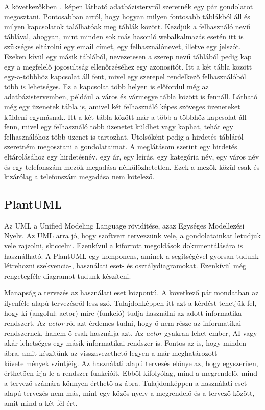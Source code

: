 \documentclass[]{thesis-ekf}
\theoremstyle{definition}
\theoremstyle{remark}
\begin{document}
	A következőkben .~képen látható adatbázistervről szeretnék egy pár gondolatot megosztani. Pontosabban arról, hogy hogyan milyen fontosabb táblákból áll és milyen kapcsolatok találhatóak meg táblák között. Kezdjük a felhasználó nevű táblával, ahogyan, mint minden sok más hasonló webalkalmazás esetén itt is szükséges eltárolni egy email címet, egy felhasználónevet, illetve egy jelszót. Ezeken kívül egy másik táblából, nevezetesen a szerep nevű táblából pedig kap egy a megfelelő jogosultság ellenőrzéséhez egy azonosítót. Itt a két tábla között egy-a-többhöz kapcsolat áll fent, mivel egy szerepel rendelkező felhasználóból több is lehetséges. Ez a kapcsolat több helyen is előfordul még az adatbázistervemben, például a város és vármegye tábla között is fennáll. Látható még egy üzenetek tábla is, amivel két felhasználó képes szöveges üzeneteket küldeni egymásnak. Itt a két tábla között már a több-a-többhöz kapcsolat áll fenn, mivel egy felhasználó több üzenetet küldhet vagy kaphat, tehát egy felhasználóhoz több üzenet is tartozhat. Utolsóként pedig a hirdetés tábláról szeretném megosztani a gondolataimat. A meglátásom szerint egy hirdetés eltárolásához egy hirdetésnév, egy ár, egy leírás, egy kategória név, egy város név és egy telefonszám mezők megadása nélkülözhetetlen. Ezek a mezők közül csak és kizárólag a telefonszám megadása nem kötelező. 
	
	\subsection{PlantUML}\label{sc-plantuml}
	Az UML a Unified Modeling Language rövidítése, azaz Egységes Modellezési Nyelv. Az UML arra jó, hogy szoftvert tervezzünk vele, a gondolatainkat letudjuk vele rajzolni, skiccelni. Ezenkívül a kiforrott megoldások dokumentálására is használható. A PlantUML egy komponens, aminek a segítségével gyorsan tudunk létrehozni szekvencia-, használati eset- és osztálydiagramokat. Ezenkívül még rengetegféle diagramot tudunk készíteni. \cite{PlantUML}
	
	Manapság a tervezés az használati eset központú. A következő pár mondatban az ilyenféle alapú tervezésről lesz szó. Tulajdonképpen itt azt a kérdést tehetjük fel, hogy ki (angolul: actor) mire (funkció) tudja használni az adott informatika rendszert. Az \emph{actor}-ról azt érdemes tudni, hogy ő nem része az informatikai rendszernek, hanem ő csak használja azt. Az \emph{actor} gyakran lehet ember, AI vagy akár lehetséges egy másik informatikai rendszer is. Fontos az is, hogy minden ábra, amit készítünk az visszavezethető legyen a már meghatározott követelmények szintjéig. Az használati alapú tervezés előnye az, hogy egyszerűen, érthetően írja le a rendszer funkcióit. Ebből kifolyólag, mind a megrendelő, mind a tervező számára könnyen érthető az ábra. Tulajdonképpen a használati eset alapú tervezés nem más, mint egy közös nyelv a megrendelő és a tervező között, amit mind a két fél ért.\cite{Kusper Informatikai}
	
\end{document}
